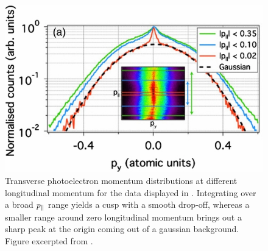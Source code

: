 \begin{figure}[htb]
  \centering
  \includegraphics[scale=1.2]{6-LES/Figures/figure6E.jpg}
  \caption[
  Experimental transverse photoelectron momentum spectra at different longitudinal momenta, observed by Pullen et al.]{
  Transverse photoelectron momentum distributions at different longitudinal momentum for the data displayed in . Integrating over a broad ${p_{\parallel}}$ range yields a cusp with a smooth drop-off, whereas a smaller range around zero longitudinal momentum brings out a sharp peak at the origin coming out of a gaussian background.
  Figure excerpted from .
  }
\label{f6-pullen-original-transverse-spectrum}
\end{figure}






